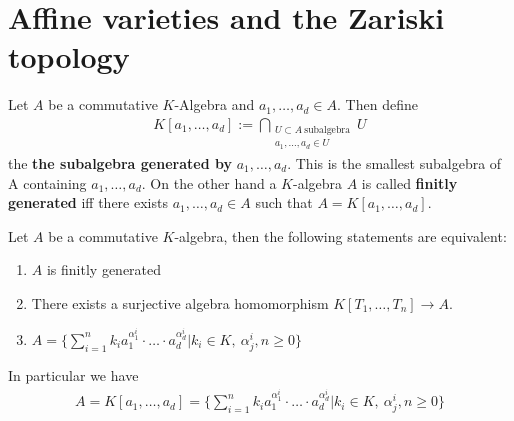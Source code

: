 \documentclass[]{article}
\begin{document}
\section{Affine varieties and the Zariski topology}

\setcounter{theorem}{2}
\begin{definition}
    Let \(A\) be a commutative \(K\)-Algebra and \(a_1, \dots , a_d \in A \). Then define 
    \begin{align*}
        K[a_1, \dots , a_d] := \bigcap_{\substack{U \subset A \ \text{subalgebra} \\ a_1, \dots , a_d \in U}} U
    \end{align*}
    the \textbf{the subalgebra generated by} \(a_1, \dots , a_d\). This is the smallest subalgebra of A
    containing \(a_1, \dots , a_d\). On the other hand a \(K\)-algebra \(A\) is called \textbf{finitly generated} iff 
    there exists \(a_1, \dots , a_d \in A\) such that \(A = K[a_1, \dots, a_d]\). 
    \label{def:finitly generated}
\end{definition}

\begin{remark*}
    Let \(A\) be a commutative \(K\)-algebra, then the following statements are equivalent:
    \begin{enumerate}[label=\arabic*)]
        \item \(A\) is finitly generated
        \item There exists a 
        surjective algebra homomorphism \(K[T_1, \dots, T_n] \rightarrow A\).
        \item \(A = \{\sum_{i=1}^{n}k_i a_1^{\alpha_1^i} \cdot \dots \cdot a_d^{\alpha_d^i}\vert k_i \in K, \ \alpha_j^i, n \geq 0\}\)
    \end{enumerate} 
    In particular we have
    \begin{align*}
        A = K[a_1, \dots, a_d]= \{\sum_{i=1}^{n}k_i a_1^{\alpha_1^i} \cdot \dots \cdot a_d^{\alpha_d^i}\vert k_i \in K, \ \alpha_j^i, n \geq 0\}
    \end{align*}
\end{remark*}
\end{document}
